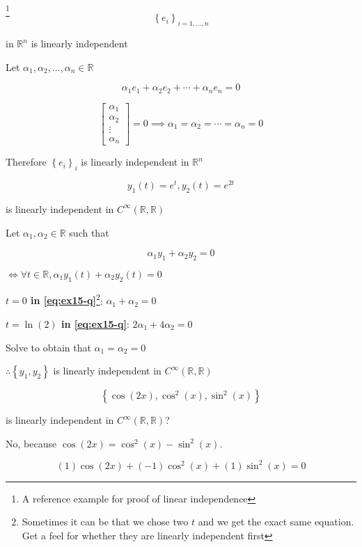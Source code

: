 \begin{example}\footnote{A reference example for proof of linear independence}
	\begin{equation} \label{eq:lin-ind-ex}
		\left\{e_i\right\}_{i=1,\ldots,n}
	\end{equation}

	in $\mathbb{R}^n$ is linearly independent

	Let $\alpha_1, \alpha_2, \ldots, \alpha_n \in \mathbb{R}$

	\[\alpha_1e_1 + \alpha_2e_2 + \cdots + \alpha_n e_n = 0\]

	\[\begin{bmatrix}
		\alpha_1\\\alpha_2\\\vdots\\\alpha_n
	\end{bmatrix} = 0 \implies \alpha_1=\alpha_2=\cdots=\alpha_n=0\]

	Therefore $\left\{e_i\right\}_i$ is linearly independent in $\mathbb{R}^n$
\end{example}

\begin{example}
	\[y_1(t)=e^t, y_2(t)=e^{2t}\]

	is linearly independent in $C^\infty(\mathbb{R}, \mathbb{R})$

	Let $\alpha_1, \alpha_2 \in \mathbb{R}$ such that

	\begin{equation} \label{eq:ex15-q}
		\alpha_1 y_1 + \alpha_2 y_2 = 0
	\end{equation}

	$\iff \forall t \in \mathbb{R}, \alpha_1 y_1(t) + \alpha_2 y_2(t) = 0$

	\textbf{$t=0$ in \cref*{eq:ex15-q}}\footnote{Sometimes it can be that we chose two $t$ and we get the exact same equation. Get a feel for whether they are linearly independent first}: $\alpha_1 + \alpha_2 = 0$

	\textbf{$t=\ln(2)$ in \cref*{eq:ex15-q}}: $2\alpha_1 + 4\alpha_2 = 0$

	Solve to obtain that $\alpha_1 = \alpha_2 = 0$

	$\therefore \left\{y_1, y_2\right\}$ is linearly independent in $C^\infty(\mathbb{R}, \mathbb{R})$
\end{example}

\begin{example}
	\[\left\{\cos(2x), \cos^2(x), \sin^2(x)\right\}\]

	is linearly independent in $C^\infty(\mathbb{R}, \mathbb{R})$?

	No, because $\cos(2x) = \cos^2(x) - \sin^2(x)$.

	\[(1)\cos(2x) + (-1)\cos^2(x) + (1)\sin^2(x) = 0\]
\end{example}

